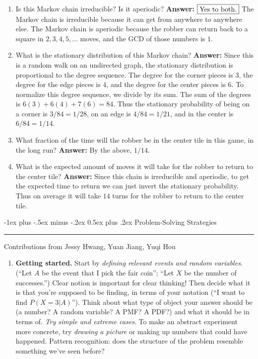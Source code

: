 \documentclass[10pt,landscape]{article}
\makeatletter
\renewcommand{\section}{\@startsection{section}{1}{0mm}%
{-1ex plus -.5ex minus -.2ex}%
{0.5ex plus .2ex}%
{\normalfont\large\bfseries}}
\makeatother
\begin{document}
\begin{multicols*}{3}
\begin{enumerate}[label=(\alph*)]
\item Is this Markov chain irreducible? Is it aperiodic? \textbf{Answer:} $\boxed{\textnormal{Yes to both.}}$ The Markov chain is irreducible because it can get from anywhere to anywhere else. The Markov chain is aperiodic because the robber can return back to a square in $2, 3, 4, 5, \dots$ moves, and the GCD of those numbers is $1$.
\item What is the stationary distribution of this Markov chain? \textbf{Answer:} Since this is a random walk on an undirected graph, the stationary distribution is proportional to the degree sequence. The degree for the corner pieces is 3, the degree for the edge pieces is 4, and the degree for the center pieces is 6. To normalize this degree sequence, we divide by its sum. The sum of the degrees is $6(3) + 6(4) + 7(6) = 84$. Thus the stationary probability of being on a corner is $3/84 = 1/28$, on an edge is $4/84 =  1/21$, and in the center is $6/84 = 1/14$.
\item What fraction of the time will the robber be in the center tile in this game, in the long run? \textbf{Answer:} By the above, $\boxed{1/14}$.
\item What is the expected amount of moves it will take for the robber to return to the center tile? \textbf{Answer:} Since this chain is irreducible and aperiodic, to get the expected time to return we can just invert the stationary probability. Thus on average it will take $\boxed{14}$ turns for the robber to return to the center tile.
\end{enumerate}


\section{Problem-Solving Strategies} \smallskip \hrule height 2pt \smallskip
Contributions from Jessy Hwang, Yuan Jiang, Yuqi Hou
\begin{enumerate}
\item \textbf{Getting started.} Start by \emph{defining relevant events and random variables}. (``Let $A$ be the event that I pick the fair coin''; ``Let $X$ be the number of successes.'') Clear notion is important for clear thinking! Then decide what it is that you're supposed to be finding, in terms of your notation (``I want to find $P(X=3|A)$''). Think about what type of object your answer should be (a number? A random variable? A PMF? A PDF?) and what it should be in terms of.
\emph{Try simple and extreme cases}. To make an abstract experiment more concrete, try \emph{drawing a picture} or making up numbers that could have happened. Pattern recognition: does the structure of the problem resemble something we've seen before?


\end{enumerate}
\end{multicols*}
\end{document}
